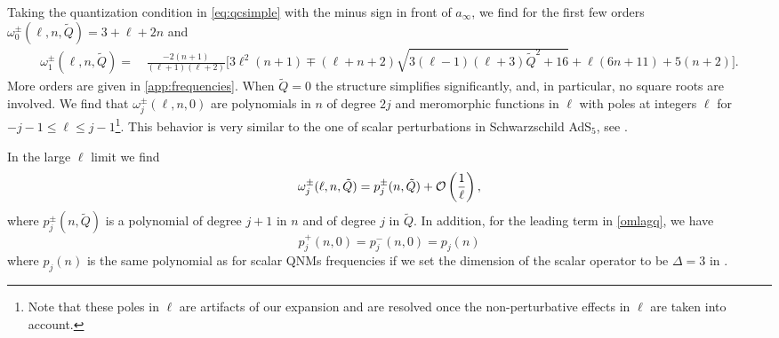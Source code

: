 \documentclass[11pt]{article}
\numberwithin{equation}{section}
\newcommand{\be}{\begin{equation}}
\newcommand{\ee}{\end{equation}}
\newcommand{\ba}{\begin{aligned}}
\newcommand{\ea}{\end{aligned}}
\begin{document}
Taking the quantization condition in \eqref{eq:qcsimple} with the minus sign in front of $a_{\infty}$, we find for the first few orders
% 
$\omega_{0}^{\pm}(\ell,n,\tilde{Q})=3 + \ell + 2 n$ and 
\be \ba \omega_1^{\pm}(\ell,n, \tilde{Q})=&\,\frac{-2 (n+1) }{(\ell+1) (\ell+2)}\biggl[3 \ell^2 (n+1)\mp(\ell+n+2) \sqrt{3 (\ell-1) (\ell+3) \tilde{Q}^2+16}+\ell (6 n+11)+5 (n+2)\biggr].%
%
\ea\ee
 More orders are given in  \autoref{app:frequencies}.
 When $\tilde{Q}=0$ the structure simplifies significantly, and, in particular, no square roots are involved.
We find  that  $\omega_{j}^{\pm}(\ell,n,0)$ are polynomials in $n$ of degree $2j$ and meromorphic functions in $\ell$ with poles at integers  $\ell$ for $-j-1\leq\ell\leq j-1$\footnote{Note that these poles in $\ell$ are artifacts of our expansion and are resolved once the non-perturbative effects in $\ell$ are taken into account. }. This behavior is very similar to the one of scalar perturbations in Schwarzschild AdS$_5$, see \cite{Dodelson:2022eiz}.
 
 In  the large $\ell$ limit we find
\be \label{omlagq}\omega_j^{\pm}(\ell,n,\tilde Q)=p_j^{\pm}(n,\tilde{Q})+\mathcal{O}\left({1\over \ell}\right), \ee where \(p_j^\pm(n,\tilde{Q})\)  is a polynomial of degree \(j+1\) in $n$  and of degree $j$ in $\tilde{Q}$. 
 In addition,  for the leading term in \eqref{omlagq}, we have 
\be p_j^+(n,0)=p_j^-(n,0)=p_j(n) \ee
where 
$p_j(n)$  is the same polynomial as for scalar QNMs frequencies if we set the dimension of the scalar operator to be $\Delta=3$   in \cite{Karlsson:2020ghx, Li:2019zba, Li:2020dqm,Dodelson:2022yvn}. 
\end{document}
